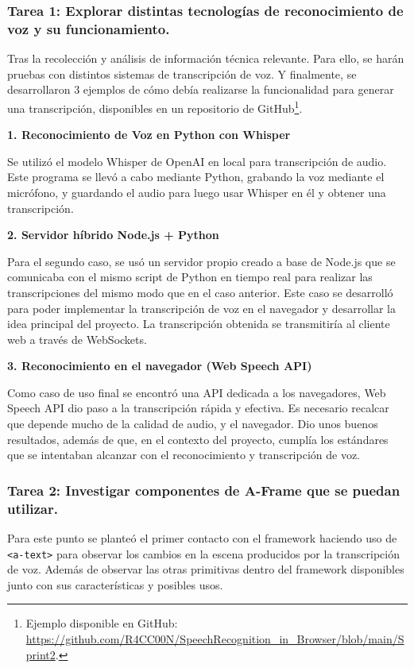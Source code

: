 \documentclass[a4paper, 12pt]{book}
\begin{document}
\subsubsection{Tarea 1: Explorar distintas tecnologías de reconocimiento de voz y su funcionamiento.}
Tras la recolección y análisis de información técnica relevante.
Para ello, se harán pruebas con distintos sistemas de transcripción de voz.
Y finalmente, se desarrollaron 3 ejemplos de cómo debía realizarse la funcionalidad para generar una transcripción, disponibles en un repositorio de GitHub\footnote{Ejemplo disponible en GitHub: \scriptsize\url{https://github.com/R4CC00N/SpeechRecognition_in_Browser/blob/main/Sprint2}.}.

\textbf{1. Reconocimiento de Voz en Python con Whisper}

Se utilizó el modelo Whisper de OpenAI en local para transcripción de audio.
Este programa se llevó a cabo mediante Python, grabando la voz mediante el micrófono, y guardando el audio para luego usar Whisper en él y obtener una transcripción.

\textbf{2. Servidor híbrido Node.js + Python}

Para el segundo caso, se usó un servidor propio creado a base de Node.js que se comunicaba con el mismo script de Python en tiempo real para realizar las transcripciones del mismo modo que en el caso anterior.
Este caso se desarrolló para poder implementar la transcripción de voz en el navegador y desarrollar la idea principal del proyecto.
La transcripción obtenida se transmitiría al cliente web a través de WebSockets.

\textbf{3. Reconocimiento en el navegador (Web Speech API)}

Como caso de uso final se encontró una API dedicada a los navegadores, Web Speech API dio paso a la transcripción rápida y efectiva. Es necesario recalcar que depende mucho de la calidad de audio, y el navegador.
Dio unos buenos resultados, además de que, en el contexto del proyecto, cumplía los estándares que se intentaban alcanzar con el reconocimiento y transcripción de voz.

\subsubsection{Tarea 2: Investigar componentes de A-Frame que se puedan utilizar.}
Para este punto se planteó el primer contacto con el framework haciendo uso de \texttt{<a-text>} para observar los cambios en la escena producidos por la transcripción de voz. Además de observar las otras primitivas dentro del framework disponibles junto con sus características y posibles usos.
\end{document}
